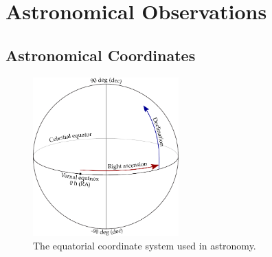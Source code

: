 

    \section{Astronomical Observations}
    \label{sec:astronomical-observations}


        \subsection{Astronomical Coordinates}
        \label{sec:coordinates}

            \begin{figure}
                \centering
                \includegraphics[width=0.5\textwidth]{images/ra-dec}
                \caption{The equatorial coordinate system used in astronomy.}
                \label{fig:equatorial-coordinates}
            \end{figure}

